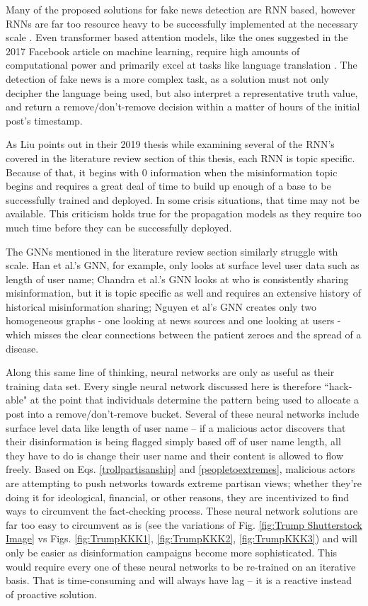 \documentclass[preprint,review,12pt]{elsarticle}
\begin{document}
Many of the proposed solutions for fake news detection are RNN based, however RNNs are far too resource heavy to be successfully implemented at the necessary scale \cite{gehring2017novel, sze2017efficient}. Even transformer based attention models, like the ones suggested in the 2017 Facebook article on machine learning, require high amounts of computational power and primarily excel at tasks like language translation \cite{vaswani2017attention}. The detection of fake news is a more complex task, as a solution must not only decipher the language being used, but also interpret a representative truth value, and return a remove/don't-remove decision within a matter of hours of the initial post's timestamp.

As Liu points out in their 2019 thesis \cite{liu2019early} while examining several of the RNN's covered in the literature review section of this thesis, each RNN is topic specific. Because of that, it begins with 0 information when the misinformation topic begins and requires a great deal of time to build up enough of a base to be successfully trained and deployed. In some crisis situations, that time may not be available. This criticism holds true for the propagation models as they require too much time before they can be successfully deployed.

The GNNs mentioned in the literature review section similarly struggle with scale. Han et al.'s GNN, for example, only looks at surface level user data such as length of user name; Chandra et al.'s GNN looks at who is consistently sharing misinformation, but it is topic specific as well and requires an extensive history of historical misinformation sharing; Nguyen et al's GNN creates only two homogeneous graphs - one looking at news sources and one looking at users - which misses the clear connections between the patient zeroes and the spread of a disease.

Along this same line of thinking, neural networks are only as useful as their training data set. Every single neural network discussed here is therefore ``hack-able" at the point that individuals determine the pattern being used to allocate a post into a remove/don't-remove bucket. Several of these neural networks include surface level data like length of user name -- if a malicious actor discovers that their disinformation is being flagged simply based off of user name length, all they have to do is change their user name and their content is allowed to flow freely. Based on Eqs. \ref{trollpartisanship} and \ref{peopletoextremes}, malicious actors are attempting to push networks towards extreme partisan views; whether they're doing it for ideological, financial, or other reasons, they are incentivized to find ways to circumvent the fact-checking process. These neural network solutions are far too easy to circumvent as is (see the variations of Fig. \ref{fig:Trump Shutterstock Image} vs Figs. \ref{fig:TrumpKKK1}, \ref{fig:TrumpKKK2}, \ref{fig:TrumpKKK3}) and will only be easier as disinformation campaigns become more sophisticated. This would require every one of these neural networks to be re-trained on an iterative basis. That is time-consuming and will always have lag -- it is a reactive instead of proactive solution.
\end{document}
